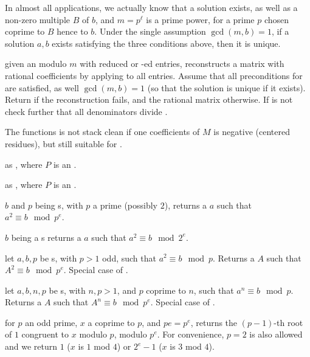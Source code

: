 In almost all applications, we actually know that a solution exists, as well
as a non-zero multiple $B$ of $b$, and $m = p^\ell$ is a prime power, for a
prime $p$ chosen coprime to $B$ hence to $b$. Under the single assumption
$\gcd(m,b) = 1$, if a solution $a,b$ exists satisfying the three conditions
above, then it is unique.

given an  modulo $m$ with reduced or -ed entries,
reconstructs a matrix with rational coefficients by applying 
to all entries. Assume that all preconditions for  are
satisfied, as well $\gcd(m,b) = 1$ (so that the solution is unique if it
exists). Return  if the reconstruction fails, and the rational
matrix otherwise. If  is not  check further that all
denominators divide .

The functions is not stack clean if one coefficients of $M$ is negative
(centered residues), but still suitable for .

 as
, where $P$ is an .

 as
, where $P$ is an .


 $b$ and $p$ being s, with $p$
a prime (possibly $2$), returns a  $a$ such that $a^2 \equiv b \mod
p^e$.

 $b$ being a s
returns a  $a$ such that $a^2 \equiv b \mod 2^e$.

 let
$a,b,p$ be s, with $p > 1$ odd, such that $a^2\equiv b\mod p$.
Returns a  $A$ such that $A^2 \equiv b \mod p^e$. Special case
of .

 let
$a,b,n,p$ be s, with $n,p > 1$, and $p$ coprime to $n$,
such that $a^n \equiv b \mod p$. Returns a  $A$ such that
$A^n \equiv b \mod p^e$. Special case of .

 for $p$ an odd prime,
$x$ a  coprime to $p$, and $pe = p^e$, returns the $(p-1)$-th root of
$1$ congruent to $x$ modulo $p$, modulo $p^e$. For convenience, $p = 2$ is
also allowed and we return $1$ ($x$ is $1$ mod $4$) or $2^e - 1$ ($x$ is $3$
mod $4$).

